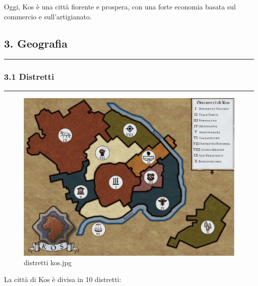 Oggi, Kos è una città fiorente e prospera, con una forte economia basata
sul commercio e sull'artigianato.

\subsection{3. Geografia}\label{geografia}

\begin{center}\rule{0.5\linewidth}{0.5pt}\end{center}

\subsubsection{3.1 Distretti}\label{distretti}

\begin{center}\rule{0.5\linewidth}{0.5pt}\end{center}

\begin{figure}
\centering
\includegraphics{distretti_kos.jpg}
\caption{distretti kos.jpg}
\end{figure}

La città di Kos è divisa in 10 distretti:

